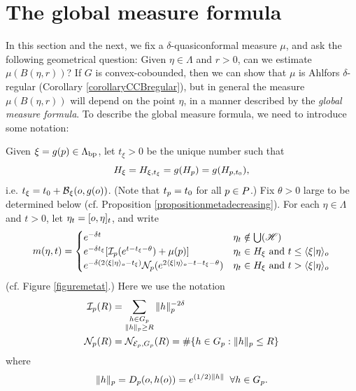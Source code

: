 \section{The global measure formula}
\label{subsectionglobalmeasure}
In this section and the next, we fix a $\delta$-quasiconformal measure $\mu$, and ask the following geometrical question: Given $\eta\in\Lambda$ and $r > 0$, can we estimate $\mu(B(\eta,r))$? If $G$ is convex-cobounded, then we can show that $\mu$ is Ahlfors $\delta$-regular (Corollary \ref{corollaryCCBregular}), but in general the measure $\mu(B(\eta,r))$ will depend on the point $\eta$, in a manner described by the \emph{global measure formula}. To describe the global measure formula, we need to introduce some notation:

\begin{notation}
\label{notationmetat}
Given $\xi = g(p)\in\Lambda_{\mathrm{bp}}$, let $t_\xi > 0$ be the unique number such that
\[
H_\xi = H_{\xi,t_\xi} = g(H_p) = g(H_{p,t_0}),
\]
i.e. $t_\xi = t_0 + \operatorname{\mathcal B}_\xi(o,g(o))$. (Note that $t_p = t_0$ for all $p\in P$.) Fix $\theta > 0$ large to be determined below (cf. Proposition \ref{propositionmetadecreasing}). For each $\eta\in\Lambda$ and $t > 0$, let $\eta_t = [o,\eta]_t$, and write
\begin{equation}
\label{metat}
m(\eta,t) = \begin{cases}
e^{-\delta t} & \eta_t\notin\bigcup(\mathscr H) \\
e^{-\delta t_\xi} [\mathcal I_p(e^{t - t_\xi - \theta}) + \mu(p)] & \eta_t\in H_\xi \textup{ and }t \leq \langle \xi|\eta\rangle_o\\
e^{-\delta (2\langle \xi|\eta\rangle_o - t_\xi)} \mathcal N_p(e^{2\langle \xi|\eta\rangle_o - t - t_\xi - \theta}) & \eta_t\in H_\xi \textup{ and } t > \langle \xi|\eta\rangle_o
\end{cases}
\end{equation}
(cf. Figure \ref{figuremetat}.) Here we use the notation
\begin{align*}
\mathcal I_p(R) &= \sum_{\substack{h\in G_p \\ \|h\|_p \geq R}} \|h\|_p^{-2\delta}\\
\mathcal N_p(R) &= \mathcal N_{\mathcal E_p,G_p}(R) = \#\{h\in G_p : \|h\|_p \leq R\}
\end{align*}
where
\[
\|h\|_p = D_p(o,h(o)) = e^{(1/2)\|h\|}
\;\;\forall h\in G_p.
\]
\end{notation}



